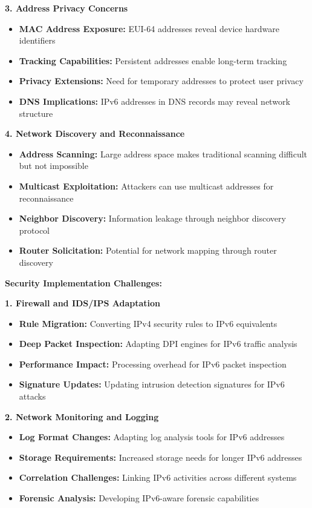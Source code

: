 \documentclass[12pt,a4paper]{article}
\begin{document}
\textbf{3. Address Privacy Concerns}
\begin{itemize}
    \item \textbf{MAC Address Exposure:} EUI-64 addresses reveal device hardware identifiers
    \item \textbf{Tracking Capabilities:} Persistent addresses enable long-term tracking
    \item \textbf{Privacy Extensions:} Need for temporary addresses to protect user privacy
    \item \textbf{DNS Implications:} IPv6 addresses in DNS records may reveal network structure
\end{itemize}

\textbf{4. Network Discovery and Reconnaissance}
\begin{itemize}
    \item \textbf{Address Scanning:} Large address space makes traditional scanning difficult but not impossible
    \item \textbf{Multicast Exploitation:} Attackers can use multicast addresses for reconnaissance
    \item \textbf{Neighbor Discovery:} Information leakage through neighbor discovery protocol
    \item \textbf{Router Solicitation:} Potential for network mapping through router discovery
\end{itemize}

\textbf{Security Implementation Challenges:}

\textbf{1. Firewall and IDS/IPS Adaptation}
\begin{itemize}
    \item \textbf{Rule Migration:} Converting IPv4 security rules to IPv6 equivalents
    \item \textbf{Deep Packet Inspection:} Adapting DPI engines for IPv6 traffic analysis
    \item \textbf{Performance Impact:} Processing overhead for IPv6 packet inspection
    \item \textbf{Signature Updates:} Updating intrusion detection signatures for IPv6 attacks
\end{itemize}

\textbf{2. Network Monitoring and Logging}
\begin{itemize}
    \item \textbf{Log Format Changes:} Adapting log analysis tools for IPv6 addresses
    \item \textbf{Storage Requirements:} Increased storage needs for longer IPv6 addresses
    \item \textbf{Correlation Challenges:} Linking IPv6 activities across different systems
    \item \textbf{Forensic Analysis:} Developing IPv6-aware forensic capabilities
\end{itemize}
\end{document}
